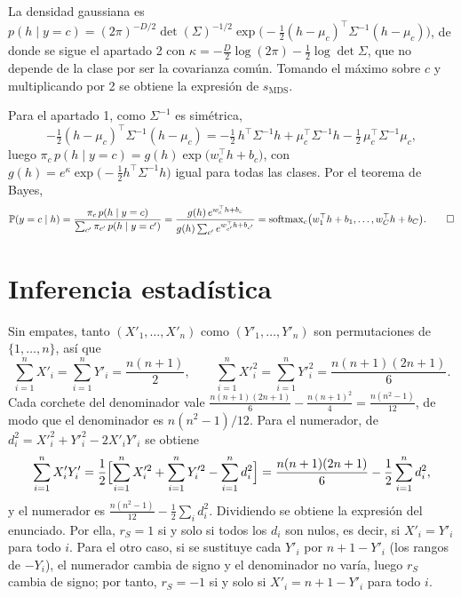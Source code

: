 \begin{demostracion}
La densidad gaussiana es $p(h \mid y = c) = (2\pi)^{-D/2} \det(\Sigma)^{-1/2} \exp\bigl(-\tfrac{1}{2}(h - \mu_c)^{\top} \Sigma^{-1} (h - \mu_c)\bigr)$, de donde se sigue el apartado 2 con $\kappa = -\tfrac{D}{2}\log(2\pi) - \tfrac{1}{2}\log\det\Sigma$, que no depende de la clase por ser la covarianza común. Tomando el máximo sobre $c$ y multiplicando por 2 se obtiene la expresión de $s_{\mathrm{MDS}}$.

Para el apartado 1, como $\Sigma^{-1}$ es simétrica,
\[
  -\tfrac{1}{2}(h - \mu_c)^{\top} \Sigma^{-1} (h - \mu_c)
  = -\tfrac{1}{2}\, h^{\top} \Sigma^{-1} h + \mu_c^{\top} \Sigma^{-1} h - \tfrac{1}{2}\, \mu_c^{\top} \Sigma^{-1} \mu_c ,
\]
luego $\pi_c\, p(h \mid y = c) = g(h) \exp\bigl(w_c^{\top} h + b_c\bigr)$, con $g(h) = e^{\kappa} \exp\bigl(-\tfrac{1}{2} h^{\top} \Sigma^{-1} h\bigr)$ igual para todas las clases. Por el teorema de Bayes,
\[
  \mathbb{P}(y = c \mid h) = \frac{\pi_c\, p(h \mid y = c)}{\sum_{c'} \pi_{c'}\, p(h \mid y = c')}
  = \frac{g(h)\, e^{w_c^{\top} h + b_c}}{g(h) \sum_{c'} e^{w_{c'}^{\top} h + b_{c'}}}
  = \operatorname{softmax}_c\bigl(w_1^{\top} h + b_1, \dots, w_C^{\top} h + b_C\bigr). \qedhere
\]
\end{demostracion}

\section{Inferencia estadística}\label{sec:dem-inferencia}

\begin{demostracion}
Sin empates, tanto $(X'_1, \dots, X'_n)$ como $(Y'_1, \dots, Y'_n)$ son permutaciones de $\{1, \dots, n\}$, así que
\[
  \sum_{i=1}^{n} X'_i = \sum_{i=1}^{n} Y'_i = \frac{n(n+1)}{2}, \qquad
  \sum_{i=1}^{n} X'^2_i = \sum_{i=1}^{n} Y'^2_i = \frac{n(n+1)(2n+1)}{6}.
\]
Cada corchete del denominador vale
$\frac{n(n+1)(2n+1)}{6} - \frac{n(n+1)^2}{4} = \frac{n(n^2-1)}{12}$, de modo que el denominador es $n(n^2-1)/12$. Para el numerador, de $d_i^2 = X'^2_i + Y'^2_i - 2X'_iY'_i$ se obtiene
\[
  \sum_{i=1}^{n} X'_i Y'_i = \frac12\Bigl[\sum_{i=1}^{n} X'^2_i + \sum_{i=1}^{n} Y'^2_i - \sum_{i=1}^{n} d_i^2\Bigr]
  = \frac{n(n+1)(2n+1)}{6} - \frac12 \sum_{i=1}^{n} d_i^2 ,
\]
y el numerador es $\frac{n(n^2-1)}{12} - \frac12\sum_i d_i^2$. Dividiendo se obtiene la expresión del enunciado. Por ella, $r_S = 1$ si y solo si todos los $d_i$ son nulos, es decir, si $X'_i = Y'_i$ para todo $i$. Para el otro caso, si se sustituye cada $Y'_i$ por $n + 1 - Y'_i$ (los rangos de $-Y_i$), el numerador cambia de signo y el denominador no varía, luego $r_S$ cambia de signo; por tanto, $r_S = -1$ si y solo si $X'_i = n + 1 - Y'_i$ para todo $i$.
\end{demostracion}

